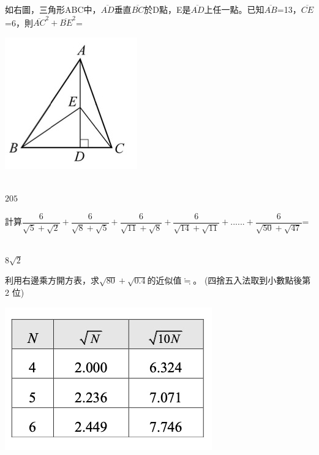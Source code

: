 \documentclass
[answers]
{exam}
\newcommand\ul[1]{\uline{\hspace*{#1}}}
\theoremstyle{definition}
\begin{document}
\begin{questions}

\begin{minipage}[t]{0.7\linewidth}

\question
如右圖，三角形ABC中，$\overline{AD}$垂直$\overline{BC}$於D點，E是$\overline{AD}$上任一點。已知$\overline{AB}$=13，$\overline{CE}$ =6，則$\overline{AC}^2+ \overline{BE}^2$=
\ul{50pt}

\end{minipage}
\hfill
\begin{minipage}[t]{0.3\linewidth}
\vspace*{-0.3cm}
\includegraphics[scale=0.5]{./figure/A_3.jpg}
\raggedleft %
\end{minipage}


\begin{solution}~\\
	$205$
\end{solution}

\question
計算$\dfrac{6}{\sqrt{5}+\sqrt{2}}+\dfrac{6}{\sqrt{8}+\sqrt{5}}+\dfrac{6}{\sqrt{11}+\sqrt{8}}+\dfrac{6}{\sqrt{14}+\sqrt{11}}+......+\dfrac{6}{\sqrt{50}+\sqrt{47}}$=
\ul{50pt}
\begin{solution}~\\
	$8\sqrt{2}$
\end{solution}

\begin{minipage}[t]{0.7\linewidth}

\question
利用右邊乘方開方表，求$\sqrt{80}+\sqrt{0.4}$的近似值$\fallingdotseq$\ul{50pt}。 (四捨五入法取到小數點後第 2 位)

\end{minipage}
\hfill
\begin{minipage}[t]{0.3\linewidth}
\vspace*{-0.3cm}
\includegraphics[scale=0.5]{./figure/A_4.jpg}
\raggedleft %
\end{minipage}


\end{questions}
\end{document}

